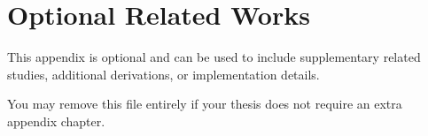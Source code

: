 \section{Optional Related Works}
\label{appx:related_template}

This appendix is optional and can be used to include supplementary related studies, additional derivations, or implementation details.

You may remove this file entirely if your thesis does not require an extra appendix chapter.
